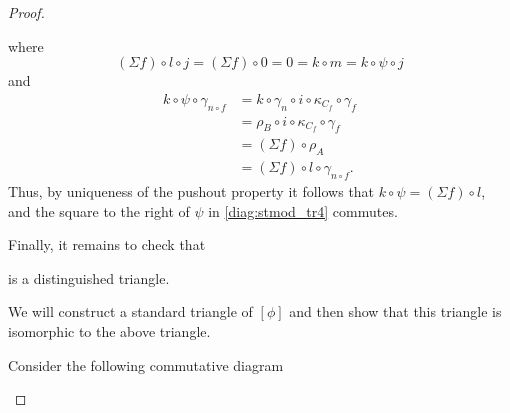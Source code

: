 \begin{proof}
\begin{enumerate}[label={(\bfseries TR\arabic*)}]
{\begin{center}
            \end{center}
            where
            \[
                (\Sigma f) \circ l \circ j = (\Sigma f) \circ 0 = 0 = k \circ m = k \circ \psi \circ j
            \]
            and
            \begin{align*}
                k \circ \psi \circ \gamma_{n \circ f} &= k \circ \gamma_n \circ i \circ \kappa_{C_f} \circ \gamma_f \\
                &= \rho_B \circ i \circ \kappa_{C_f} \circ \gamma_f \\
                &= (\Sigma f) \circ \rho_A \\
                &= (\Sigma f) \circ l \circ \gamma_{n \circ f}.
            \end{align*}
            Thus, by uniqueness of the pushout property it follows that \( k \circ \psi = (\Sigma f) \circ l \), and the square to the right of \( \psi \) in \autoref{diag:stmod_tr4} commutes.

            Finally, it remains to check that
            \begin{center}
            \end{center}
            is a distinguished triangle.

            We will construct a standard triangle of \( [\phi] \) and then show that this triangle is isomorphic to the above triangle.

            Consider the following commutative diagram
            \begin{center}
\end{center}}
\end{enumerate}
\end{proof}

